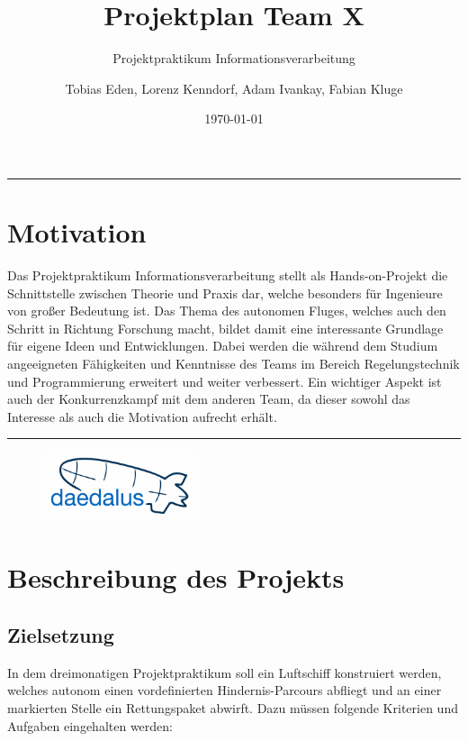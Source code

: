 \documentclass[lang=ngerman,inputenc=utf8,fontsize=10pt]{ldvarticle}
\title{Projektplan Team X}
\subtitle{Projektpraktikum Informationsverarbeitung}
\author{Tobias Eden, Lorenz Kenndorf, Adam Ivankay, Fabian Kluge}
\date{\today}
\begin{document}
	\maketitle	
	\thispagestyle{empty}

\hrule

\section*{Motivation}

Das Projektpraktikum Informationsverarbeitung stellt als Hands-on-Projekt die Schnittstelle zwischen Theorie und Praxis dar, welche besonders für Ingenieure von großer Bedeutung ist.
Das Thema des autonomen Fluges, welches auch den Schritt in Richtung Forschung macht, bildet damit eine interessante Grundlage für eigene Ideen und Entwicklungen. 
Dabei werden die während dem Studium angeeigneten Fähigkeiten und Kenntnisse des Teams im Bereich Regelungstechnik und Programmierung erweitert und weiter verbessert. 
Ein wichtiger Aspekt ist auch der  Konkurrenzkampf mit dem anderen Team, da dieser sowohl das Interesse als auch die Motivation aufrecht erhält.   




\vspace*{1cm}
\hrule


\begin{figure}[!b]
\centering
\includegraphics[width=0.4\textwidth]{logo_kl.png}
\end{figure}

\newpage


\section{Beschreibung des Projekts}

\subsection*{Zielsetzung}
In dem dreimonatigen Projektpraktikum soll ein Luftschiff konstruiert werden, welches autonom einen vordefinierten Hindernis-Parcours abfliegt und an einer markierten Stelle ein Rettungspaket abwirft. Dazu müssen folgende Kriterien und Aufgaben eingehalten werden:
\end{document}
